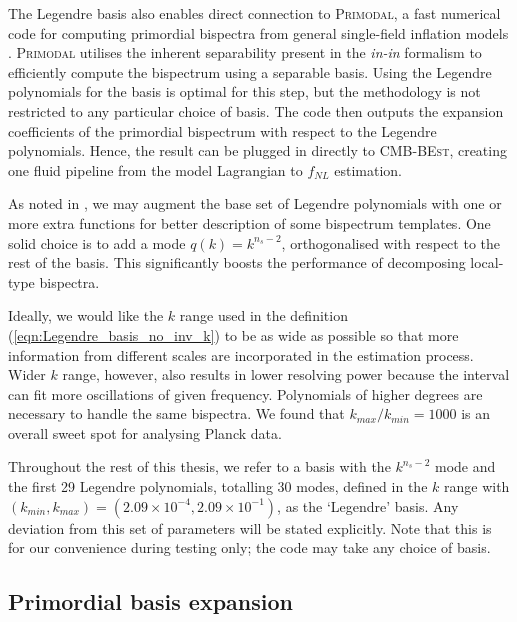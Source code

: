 The Legendre basis also enables direct connection to \textsc{Primodal}, a fast numerical code for computing primordial bispectra from general single-field inflation models \cite{Clarke2021}. \textsc{Primodal} utilises the inherent separability present in the \textit{in-in} formalism to efficiently compute the bispectrum using a separable basis. Using the Legendre polynomials for the basis is optimal for this step, but the methodology is not restricted to any particular choice of basis. The code then outputs the expansion coefficients of the primordial bispectrum with respect to the Legendre polynomials. Hence, the result can be plugged in directly to \textsc{CMB-BEst}, creating one fluid pipeline from the model Lagrangian to $f_{NL}$ estimation.

As noted in \cite{Clarke2021}, we may augment the base set of Legendre polynomials with one or more extra functions for better description of some bispectrum templates. One solid choice is to add a mode $q(k) = k^{n_s -2}$, orthogonalised with respect to the rest of the basis. This significantly boosts the performance of decomposing local-type bispectra.

Ideally, we would like the $k$ range used in the definition (\ref{eqn:Legendre_basis_no_inv_k}) to be as wide as possible so that more information from different scales are incorporated in the estimation process. Wider $k$ range, however, also results in lower resolving power because the interval can fit more oscillations of given frequency. Polynomials of higher degrees are necessary to handle the same bispectra. We found that $k_{max}/k_{min} = 1000$ is an overall sweet spot for analysing Planck data.

Throughout the rest of this thesis, we refer to a basis with the $k^{n_s - 2}$ mode and the first 29 Legendre polynomials, totalling 30 modes, defined in the $k$ range with $(k_{min}, k_{max}) = (2.09 \times 10^{-4}, 2.09 \times 10^{-1})$, as the `Legendre' basis. Any deviation from this set of parameters will be stated explicitly. Note that this is for our convenience during testing only; the code may take any choice of basis.


\subsection{Primordial basis expansion} \label{section:primordial_basis_expansion}

